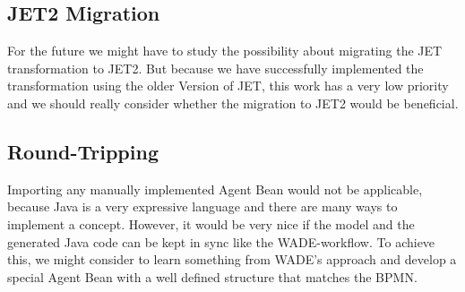 \subsection{JET2 Migration}
For the future we might have to study the possibility about migrating the JET transformation to JET2. But because we have successfully implemented the transformation using the older Version of JET, this work has a very low priority and we should really consider whether the migration to JET2 would be beneficial. 

\subsection{Round-Tripping}
Importing any manually implemented Agent Bean would not be applicable, because Java is a very expressive language and there are many ways to implement a concept. However, it would be very nice if the model and the generated Java code can be kept in sync like the WADE-workflow. To achieve this, we might consider to learn something from WADE's approach and develop a special Agent Bean with a well defined structure that matches the BPMN. 

